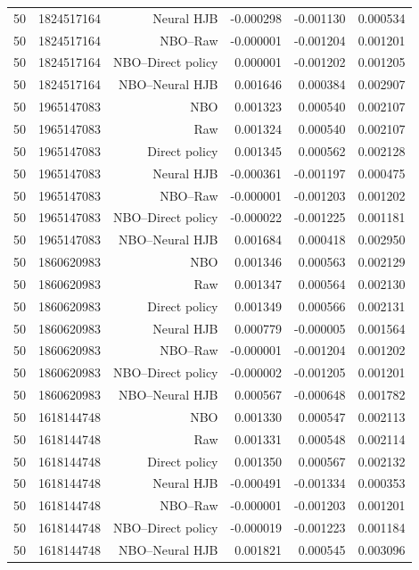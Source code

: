 \begin{longtable}{lrrrrr}
50 & 1824517164 & Neural HJB & -0.000298 & -0.001130 & 0.000534 \\
50 & 1824517164 & NBO--Raw & -0.000001 & -0.001204 & 0.001201 \\
50 & 1824517164 & NBO--Direct policy & 0.000001 & -0.001202 & 0.001205 \\
50 & 1824517164 & NBO--Neural HJB & 0.001646 & 0.000384 & 0.002907 \\
50 & 1965147083 & NBO & 0.001323 & 0.000540 & 0.002107 \\
50 & 1965147083 & Raw & 0.001324 & 0.000540 & 0.002107 \\
50 & 1965147083 & Direct policy & 0.001345 & 0.000562 & 0.002128 \\
50 & 1965147083 & Neural HJB & -0.000361 & -0.001197 & 0.000475 \\
50 & 1965147083 & NBO--Raw & -0.000001 & -0.001203 & 0.001202 \\
50 & 1965147083 & NBO--Direct policy & -0.000022 & -0.001225 & 0.001181 \\
50 & 1965147083 & NBO--Neural HJB & 0.001684 & 0.000418 & 0.002950 \\
50 & 1860620983 & NBO & 0.001346 & 0.000563 & 0.002129 \\
50 & 1860620983 & Raw & 0.001347 & 0.000564 & 0.002130 \\
50 & 1860620983 & Direct policy & 0.001349 & 0.000566 & 0.002131 \\
50 & 1860620983 & Neural HJB & 0.000779 & -0.000005 & 0.001564 \\
50 & 1860620983 & NBO--Raw & -0.000001 & -0.001204 & 0.001202 \\
50 & 1860620983 & NBO--Direct policy & -0.000002 & -0.001205 & 0.001201 \\
50 & 1860620983 & NBO--Neural HJB & 0.000567 & -0.000648 & 0.001782 \\
50 & 1618144748 & NBO & 0.001330 & 0.000547 & 0.002113 \\
50 & 1618144748 & Raw & 0.001331 & 0.000548 & 0.002114 \\
50 & 1618144748 & Direct policy & 0.001350 & 0.000567 & 0.002132 \\
50 & 1618144748 & Neural HJB & -0.000491 & -0.001334 & 0.000353 \\
50 & 1618144748 & NBO--Raw & -0.000001 & -0.001203 & 0.001201 \\
50 & 1618144748 & NBO--Direct policy & -0.000019 & -0.001223 & 0.001184 \\
50 & 1618144748 & NBO--Neural HJB & 0.001821 & 0.000545 & 0.003096 \\

\end{longtable}
